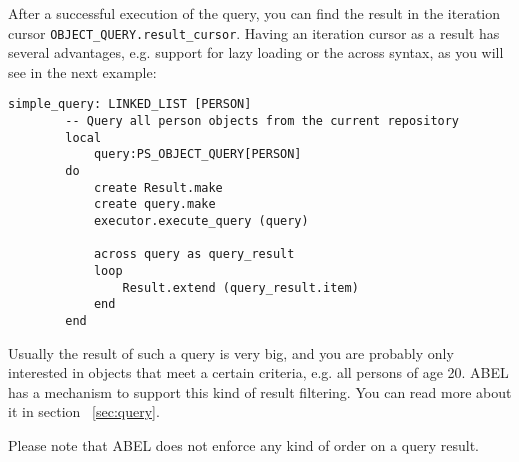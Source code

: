 After a successful execution of the query, you can find the result in the iteration cursor \lstinline!OBJECT_QUERY.result_cursor!.
Having an iteration cursor as a result has several advantages, e.g. support for lazy loading or the across syntax, as you will see in the next example:

\begin{lstlisting}[language=OOSC2Eiffel, captionpos=b, caption={}, label={lst:simple_query}]
	simple_query: LINKED_LIST [PERSON]
		-- Query all person objects from the current repository
		local
			query:PS_OBJECT_QUERY[PERSON]
		do
			create Result.make
			create query.make
			executor.execute_query (query)

			across query as	query_result
			loop
				Result.extend (query_result.item)
			end
		end
\end{lstlisting}

Usually the result of such a query is very big, and you are probably only interested in objects that meet a certain criteria, e.g. all persons of age 20.
ABEL has a mechanism to support this kind of result filtering. You can read more about it in section ~\ref{sec:query}.

Please note that ABEL does not enforce any kind of order on a query result.

\begin{comment}
ABEL can also filter the query results in advance so you only get a result set that meets certain criteria: 

\begin{lstlisting}[language=OOSC2Eiffel, captionpos=b, caption={}, label={lst:simple_filtered_query}]
	simple_filtered_query (name:STRING; age:INTEGER): detachable PERSON
		-- Query a person object from the current repository
		local
			query:PS_OBJECT_QUERY[PERSON]
			criterion:PS_PREDEFINED_CRITERION
		do
			create query.make
			create criterion.make ("last_name", "=", name)
			query.set_criterion (criterion)

			from
				executor.execute_query (query)
			until 
				query.result_cursor.after
			loop
				if query.result_cursor.item.age = age then 
					Result:= query.result_cursor.item
				end
			end
		end
\end{lstlisting}

This is just a very simple example for a query with a certain criterion.
ABEL has a powerful mechanism that also supports a logical combinations of multiple criteria, or using agents for filtering.
You can read more about criteria in section XY.

\end{comment}

